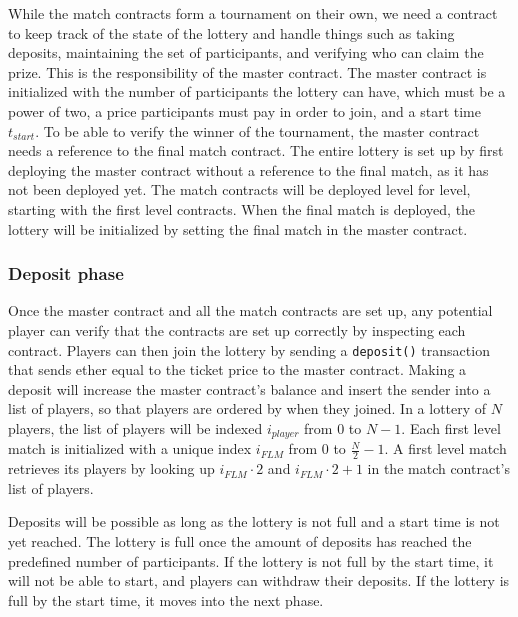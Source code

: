 While the match contracts form a tournament on their own, we need a contract to keep track of the state of the lottery and handle things such as taking deposits, maintaining the set of participants, and verifying who can claim the prize. This is the responsibility of the master contract. The master contract is initialized with the number of participants the lottery can have, which must be a power of two, a price participants must pay in order to join, and a start time $t_{start}$. To be able to verify the winner of the tournament, the master contract needs a reference to the final match contract. The entire lottery is set up by first deploying the master contract without a reference to the final match, as it has not been deployed yet. The match contracts will be deployed level for level, starting with the first level contracts. When the final match is deployed, the lottery will be initialized by setting the final match in the master contract. 


\subsubsection{Deposit phase}
Once the master contract and all the match contracts are set up, any potential player can verify that the contracts are set up correctly by inspecting each contract. Players can then join the lottery by sending a \texttt{deposit()} transaction that sends ether equal to the ticket price to the master contract. Making a deposit will increase the master contract's balance and insert the sender into a list of players, so that players are ordered by when they joined. In a lottery of $N$ players, the list of players will be indexed $i_{player}$ from $0$ to $N-1$. Each first level match is initialized with a unique index $i_{FLM}$ from $0$ to $\frac{N}{2}-1$. A first level match retrieves its players by looking up $i_{FLM} \cdot 2$ and $i_{FLM} \cdot 2 + 1$ in the match contract's list of players.

Deposits will be possible as long as the lottery is not full and a start time is not yet reached. The lottery is full once the amount of deposits has reached the predefined number of participants. If the lottery is not full by the start time, it will not be able to start, and players can withdraw their deposits. If the lottery is full by the start time, it moves into the next phase.

